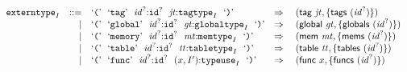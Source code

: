 $$
\begin{array}[t]{@{}lrrl@{}l@{}l@{}l@{}}
& {{\mathtt{externtype}}}_{I} & ::= & \mbox{‘\texttt{{(}}’}~~\mbox{‘\texttt{tag}’}~~{{\mathit{id}}^?}{:}{{\mathtt{id}}^?}~~{\mathit{jt}}{:}{{\mathtt{tagtype}}}_{I}~~\mbox{‘\texttt{{)}}’} & \quad\Rightarrow\quad{} & (\mathsf{tag}~{\mathit{jt}}, \{ \mathsf{tags}~({{\mathit{id}}^?}) \}) \\
& & | & \mbox{‘\texttt{{(}}’}~~\mbox{‘\texttt{global}’}~~{{\mathit{id}}^?}{:}{{\mathtt{id}}^?}~~{\mathit{gt}}{:}{{\mathtt{globaltype}}}_{I}~~\mbox{‘\texttt{{)}}’} & \quad\Rightarrow\quad{} & (\mathsf{global}~{\mathit{gt}}, \{ \mathsf{globals}~({{\mathit{id}}^?}) \}) \\
& & | & \mbox{‘\texttt{{(}}’}~~\mbox{‘\texttt{memory}’}~~{{\mathit{id}}^?}{:}{{\mathtt{id}}^?}~~{\mathit{mt}}{:}{{\mathtt{memtype}}}_{I}~~\mbox{‘\texttt{{)}}’} & \quad\Rightarrow\quad{} & (\mathsf{mem}~{\mathit{mt}}, \{ \mathsf{mems}~({{\mathit{id}}^?}) \}) \\
& & | & \mbox{‘\texttt{{(}}’}~~\mbox{‘\texttt{table}’}~~{{\mathit{id}}^?}{:}{{\mathtt{id}}^?}~~{\mathit{tt}}{:}{{\mathtt{tabletype}}}_{I}~~\mbox{‘\texttt{{)}}’} & \quad\Rightarrow\quad{} & (\mathsf{table}~{\mathit{tt}}, \{ \mathsf{tables}~({{\mathit{id}}^?}) \}) \\
& & | & \mbox{‘\texttt{{(}}’}~~\mbox{‘\texttt{func}’}~~{{\mathit{id}}^?}{:}{{\mathtt{id}}^?}~~(x, {I'}){:}{{\mathtt{typeuse}}}_{I}~~\mbox{‘\texttt{{)}}’} & \quad\Rightarrow\quad{} & (\mathsf{func}~x, \{ \mathsf{funcs}~({{\mathit{id}}^?}) \}) \\
\end{array}
$$

\vspace{1ex}

